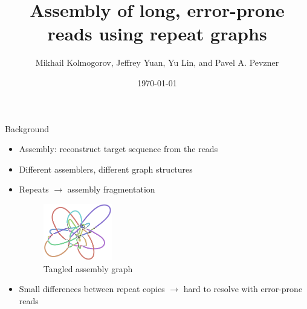 \documentclass{beamer}
\title{Assembly of long, error-prone reads using repeat graphs}
\date{\today}
\author{Mikhail Kolmogorov, Jeffrey Yuan, Yu Lin, and Pavel A. Pevzner}
\institute{Johannes Hausmann, Luis Kress}
\begin{document}
  \maketitle
  
  
  \begin{frame}{Background}
    \begin{itemize}[<+- | alert@+>]
      \item Assembly: reconstruct target sequence from the reads

      \item Different assemblers, different graph structures

      \item Repeats $\rightarrow$ assembly fragmentation
      \begin{figure}
        \includegraphics[width=3cm]{presentation/images/tangled.png}
        \caption{Tangled assembly graph\cite{kolmogorov_assembly_2019}}
        \label{fig:tangled}
      \end{figure}

      \item Small differences between repeat copies $\rightarrow$ hard to
      resolve with error-prone reads

    \end{itemize}
  \end{frame}

  

\end{document}
